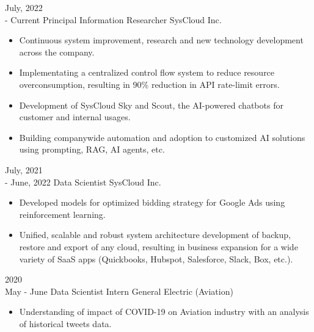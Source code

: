 \documentclass[10pt]{developercv} %
\begin{document}
\vspace{-15 pt}
\begin{entrylist}
    \entry
    {July, 2022\\ - Current}
    {Principal Information Researcher}
    {SysCloud Inc.}
    {\vspace{-7pt}\small
        \begin{itemize}[noitemsep,topsep=0pt,parsep=0pt,partopsep=0pt, leftmargin=-1pt]
            \item Continuous system improvement, research and new technology development across the company.
            \item Implementating a centralized control flow system to reduce resource overconsumption, resulting in $90\%$ reduction in API rate-limit errors.
            \item Development of SysCloud Sky and Scout, the AI-powered chatbots for customer and internal usages.  
            \item Building companywide automation and adoption to customized AI solutions using prompting, RAG, AI agents, etc.
        \end{itemize}
    }
    \entry
    {July, 2021\\- June, 2022}
    {Data Scientist}
    {SysCloud Inc.}
    {\vspace{-7pt}\small
        \begin{itemize}[noitemsep,topsep=0pt,parsep=0pt,partopsep=0pt, leftmargin=-1pt]
            \item Developed models for optimized bidding strategy for Google Ads using reinforcement learning.
            \item Unified, scalable and robust system architecture development of backup, restore and export of any cloud, resulting in business expansion for a wide variety of SaaS apps (Quickbooks, Hubspot, Salesforce, Slack, Box, etc.).
        \end{itemize}
    }
    \entry
    {2020\\\footnotesize{May - June}}
    {Data Scientist Intern}
    {General Electric (Aviation)}
    {\vspace{-7pt}\small
        \begin{itemize}[noitemsep,topsep=0pt,parsep=0pt,partopsep=0pt, leftmargin=-1pt]
            \item Understanding of impact of COVID-19 on Aviation industry with an analysis of historical tweets data.

\end{itemize}}
\end{entrylist}
\end{document}

